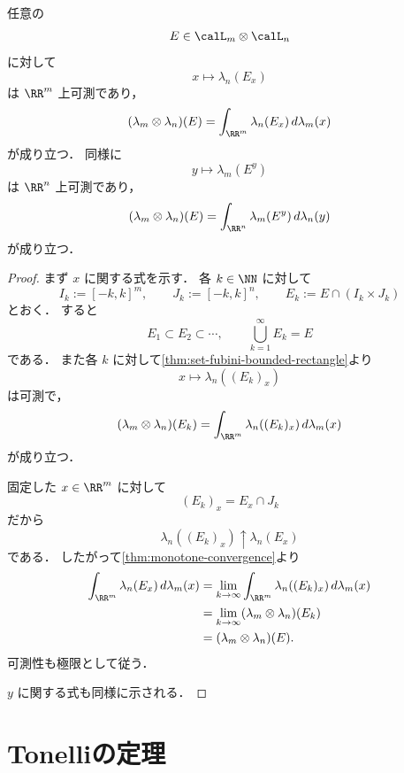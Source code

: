 \begin{theorem}[一般の集合]\label{thm:set-fubini-general}
任意の
\[
E\in\calL_m\otimes\calL_n
\]
に対して
\[
x\longmapsto \lambda_n(E_x)
\]
は $\RR^m$ 上可測であり，
\[
(\lambda_m\otimes\lambda_n)(E)=\int_{\RR^m}\lambda_n(E_x)\,d\lambda_m(x)
\]
が成り立つ．
同様に
\[
y\longmapsto \lambda_m(E^y)
\]
は $\RR^n$ 上可測であり，
\[
(\lambda_m\otimes\lambda_n)(E)=\int_{\RR^n}\lambda_m(E^y)\,d\lambda_n(y)
\]
が成り立つ．
\end{theorem}
\begin{proof}
まず $x$ に関する式を示す．
各 $k\in\NN$ に対して
\[
I_k:=[-k,k]^m,\qquad J_k:=[-k,k]^n,
\qquad
E_k:=E\cap (I_k\times J_k)
\]
とおく．
すると
\[
E_1\subset E_2\subset \cdots,\qquad
\bigcup_{k=1}^{\infty}E_k=E
\]
である．
また各 $k$ に対して\cref{thm:set-fubini-bounded-rectangle}より
\[
x\mapsto \lambda_n((E_k)_x)
\]
は可測で，
\[
(\lambda_m\otimes\lambda_n)(E_k)=\int_{\RR^m}\lambda_n((E_k)_x)\,d\lambda_m(x)
\]
が成り立つ．

固定した $x\in\RR^m$ に対して
\[
(E_k)_x=E_x\cap J_k
\]
だから
\[
\lambda_n((E_k)_x)\uparrow \lambda_n(E_x)
\]
である．
したがって\cref{thm:monotone-convergence}より
\begin{align*}
\int_{\RR^m}\lambda_n(E_x)\,d\lambda_m(x)
&=
\lim_{k\to\infty}\int_{\RR^m}\lambda_n((E_k)_x)\,d\lambda_m(x) \\
&=
\lim_{k\to\infty}(\lambda_m\otimes\lambda_n)(E_k) \\
&=
(\lambda_m\otimes\lambda_n)(E).
\end{align*}
可測性も極限として従う．

$y$ に関する式も同様に示される．
\end{proof}

\section{Tonelliの定理}

